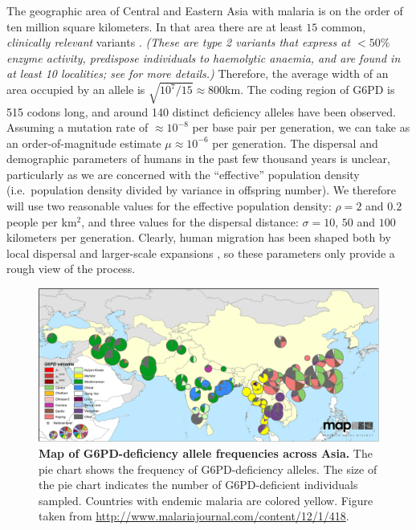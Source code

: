 \documentclass{article}
\newcommand{\plr}[1]{{\it\color{Fuchsia}#1}}
\begin{document}


The geographic area of Central and Eastern Asia with malaria is 
on the order of ten million square kilometers.
In that area there are at least $15$ common, \plr{clinically relevant} variants \citep[see Figure \ref{fig-G6PD-map}, from][]{Howes-g6pd-variants}. 
\plr{(These are type 2 variants that express at ${}<50\%$ enzyme activity, 
predispose individuals to haemolytic anaemia, 
and are found in at least 10 localities;
see \citet{Howes-g6pd-variants} for more details.)}
Therefore, the average width of an area occupied by an allele is $\sqrt{10^7/15} \approx  800$km. 
The coding region of G6PD is 515 codons long, 
and around 140 distinct deficiency alleles have been observed. 
Assuming a mutation rate of $\approx 10^{-8}$ per base pair per generation, 
we can take as an order-of-magnitude estimate $\mu \approx 10^{-6}$ per generation. 
The dispersal and demographic parameters of humans in the past few thousand years is unclear,
particularly as we are concerned with the ``effective'' population density
(i.e.\ population density divided by variance in offspring number).
We therefore will use two reasonable values for the effective population density: $\rho=2$ and $0.2$ people per km$^2$,
and three values for the dispersal distance: $\sigma=10$, $50$ and $100$ kilometers per generation.
Clearly, human migration has been shaped both by local dispersal and larger-scale expansions 
\citep[see][for a recent discussion]{Pickrell:14}, 
so these parameters only provide a rough view of the process.

\begin{figure}[ht]
\begin{center}
  \includegraphics[width=1.0\textwidth]{G6pd_Howes_et_al_1475-2875-12-418-4}   %
\caption{ 
{\bf Map of G6PD-deficiency allele frequencies across Asia.} 
The pie chart shows the frequency of G6PD-deficiency alleles. 
The size of the pie chart indicates the number of G6PD-deficient individuals sampled.
Countries with endemic malaria are colored yellow. 
Figure taken from \citet{Howes-g6pd-variants}
\url{http://www.malariajournal.com/content/12/1/418}. 
} \label{fig-G6PD-map}
\end{center}
\end{figure}
\end{document}
